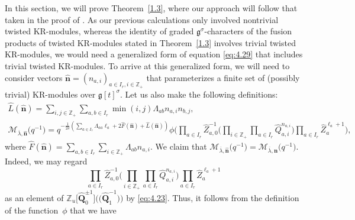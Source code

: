 \documentclass[10pt,a4paper]{amsart}
\numberwithin{equation}{section}
\begin{document}
In this section, we will prove Theorem~\ref{1.3}, where our approach will follow that taken in the proof of \cite[Section 5]{Lin21}. As our previous calculations only involved nontrivial twisted KR-modules, whereas the identity of graded $\mathfrak{g}^{ \sigma}$-characters of the fusion products of twisted KR-modules stated in Theorem~\ref{1.3} involves trivial twisted KR-modules, we would need a generalized form of equation \eqref{eq:4.29} that includes trivial twisted KR-modules. To arrive at this generalized form, we will need to consider vectors $\widehat{\mathbf{n}}=(n_{a,i})_{a\in I_r,i\in\mathbb{Z}_+}$ that parameterizes a finite set of (possibly trivial) KR-modules over $\mathfrak{g}[t]^{\sigma}$. Let us also make the following definitions:
\begin{gather*}
\widehat{L}(\widehat{\mathbf{n}})
=\sum_{i,j\in\mathbb{Z}_+}\sum_{a,b\in I_r}\min(i,j)\Lambda_{ab} n_{a,i}n_{b,j},\\
\mathcal{M}_{\overline{\lambda},\widehat{\mathbf{n}}}\bigl(q^{-1}\bigr)
=q^{-\frac{1}{2\delta}(\sum_{a\in I_r}\Lambda_{aa}\ell_a+2\widehat{F}(\widehat{\mathbf{n}})+\widehat{L}(\widehat{\mathbf{n}}))}\phi\biggl(\prod_{a\in I_r}\widehat{Z}_{a,0}^{-1}\biggl(\prod_{i\in\mathbb{Z}_+}\prod_{a\in I_r}\widehat{Q}_{a,i}^{n_{a,i}}\biggr)\prod_{a\in I_r}\widehat{Z}_a^{\ell_a+1}\biggr),
\end{gather*}
where
$
\widehat{F}(\widehat{\mathbf{n}})=
\sum_{a,b\in I_r}\sum_{i\in\mathbb{Z}_+}\Lambda_{ab}n_{a,i}$.
We claim that $\mathcal{M}_{\overline{\lambda},\widehat{\mathbf{n}}}\bigl(q^{-1}\bigr)=\mathcal{M}_{\overline{\lambda},\mathbf{n}}\bigl(q^{-1}\bigr)$. Indeed, we may regard
\begin{equation*}
\prod_{a\in I_r}\widehat{Z}_{a,0}^{-1}\biggl(\prod_{i\in\mathbb{Z}_+}\prod_{a\in I_r}\widehat{Q}_{a,i}^{n_{a,i}}\biggr)\prod_{a\in I_r}\widehat{Z}_a^{\ell_a+1}
\end{equation*}
as an element of $\mathbb{Z}_u\bigl[\widehat{\mathbf{Q}}_0^{\pm1}\bigr]\bigl(\bigl(\widehat{\mathbf{Q}}_1^{-1}\bigr)\bigr)$ by \eqref{eq:4.23}. Thus, it follows from the definition of the function~$\phi$ that we have
\end{document}
